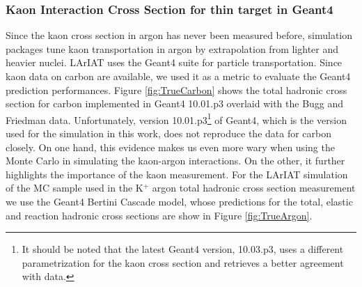  \subsubsection{Kaon Interaction Cross Section for thin target in Geant4}
Since the kaon cross section in argon has never been measured before, simulation packages tune kaon transportation in argon by extrapolation from lighter and heavier nuclei. LArIAT uses the Geant4 suite for particle transportation.  Since kaon data on carbon are available, we used it as a metric to evaluate the Geant4 prediction performances.  Figure \ref{fig:TrueCarbon} shows the total hadronic cross section for carbon implemented in Geant4 10.01.p3 overlaid with the Bugg and Friedman data. Unfortunately, version 10.01.p3\footnote{It should be noted that the latest Geant4 version, 10.03.p3, uses a different parametrization for the kaon cross section and retrieves a better agreement with data.}  of Geant4, which is the version used for the simulation in this work, does not reproduce the data for carbon closely. On one hand, this evidence makes us even more wary when using the Monte Carlo in simulating the kaon-argon interactions. On the other, it further highlights the importance of the kaon measurement. 
For the LArIAT simulation of the MC sample used in the K$^+$ argon total hadronic cross section measurement we use the Geant4 Bertini Cascade model, whose  predictions for the total, elastic and reaction hadronic cross sections are show in Figure \ref{fig:TrueArgon}.


